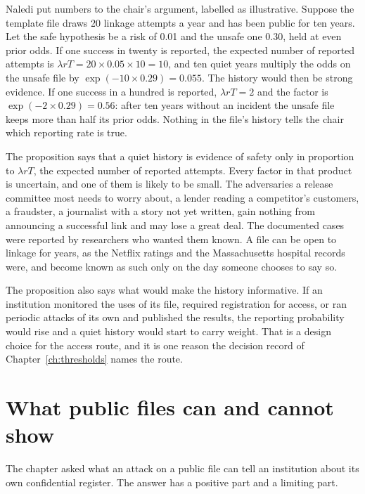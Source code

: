 \begin{example}\label{c12:ex-quiet}
Naledi put numbers to the chair's argument, labelled as illustrative. Suppose the
template file draws 20 linkage attempts a year and has been public for ten years. Let the
safe hypothesis be a risk of 0.01 and the unsafe one 0.30, held at even prior odds. If one
success in twenty is reported, the expected number of reported attempts is
$\lambda r T = 20 \times 0.05 \times 10 = 10$, and ten quiet years multiply the odds on the
unsafe file by $\exp(-10 \times 0.29) = 0.055$. The history would then be strong evidence.
If one success in a hundred is reported, $\lambda r T = 2$ and the factor is
$\exp(-2 \times 0.29) = 0.56$: after ten years without an incident the unsafe file keeps
more than half its prior odds. Nothing in the file's history tells the chair which
reporting rate is true.
\end{example}


The proposition says that a quiet history is evidence of safety only in proportion to
$\lambda r T$, the expected number of reported attempts. Every factor in that product is
uncertain, and one of them is likely to be small. The adversaries a release committee
most needs to worry about, a lender reading a competitor's customers, a fraudster, a
journalist with a story not yet written, gain nothing from announcing a successful link
and may lose a great deal. The documented cases were reported by researchers who wanted
them known. A file can be open to linkage for years, as the Netflix ratings and the
Massachusetts hospital records were, and become known as such only on the day someone
chooses to say so.

The proposition also says what would make the history informative. If an institution
monitored the uses of its file, required registration for access, or ran periodic attacks
of its own and published the results, the reporting probability would rise and a quiet
history would start to carry weight. That is a design choice for the access route, and it
is one reason the decision record of Chapter~\ref{ch:thresholds} names the route.

\section{What public files can and cannot show}

The chapter asked what an attack on a public file can tell an institution about its own
confidential register. The answer has a positive part and a limiting part.

